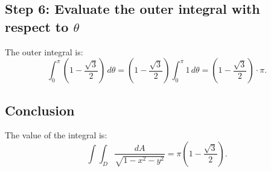 \documentclass[11pt]{article}
\begin{document}
\subsection{Step 6: Evaluate the outer integral with respect to \( \theta \)}

The outer integral is:
\[
\int_{0}^{\pi} \left( 1 - \frac{\sqrt{3}}{2} \right) \, d\theta = \left( 1 - \frac{\sqrt{3}}{2} \right) \int_{0}^{\pi} 1 \, d\theta = \left( 1 - \frac{\sqrt{3}}{2} \right) \cdot \pi.
\]
\newpage

\subsection{Conclusion}

The value of the integral is:
\[
\int \int_{D} \frac{dA}{\sqrt{1 - x^2 - y^2}} = \pi \left( 1 - \frac{\sqrt{3}}{2} \right).
\]
\end{document}
